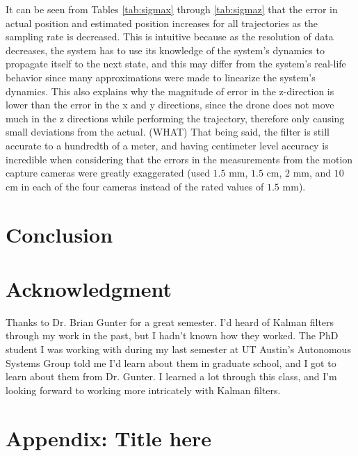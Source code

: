 \documentclass[letterpaper, preprint, paper,11pt]{AAS}	%
\begin{document}
It can be seen from Tables \ref{tab:sigmax} through \ref{tab:sigmaz} that the error in actual position and estimated position increases for all trajectories as the sampling rate is decreased. This is intuitive because as the resolution of data decreases, the system has to use its knowledge of the system's dynamics to propagate itself to the next state, and this may differ from the system's real-life behavior since many approximations were made to linearize the system's dynamics. This also explains why the magnitude of error in the z-direction is lower than the error in the x and y directions, since the drone does not move much in the z directions while performing the trajectory, therefore only causing small deviations from the actual. (WHAT) That being said, the filter is still accurate to a hundredth of a meter, and having centimeter level accuracy is incredible when considering that the errors in the measurements from the motion capture cameras were greatly exaggerated (used $1.5$ mm, $1.5$ cm, $2$ mm, and $10$ cm in each of the four cameras instead of the rated values of $1.5$ mm\cite{vicon_2022}).

\section{Conclusion}


\section{Acknowledgment}

Thanks to Dr. Brian Gunter for a great semester. I'd heard of Kalman filters through my work in the past, but I hadn't known how they worked. The PhD student I was working with during my last semester at UT Austin's Autonomous Systems Group told me I'd learn about them in graduate school, and I got to learn about them from Dr. Gunter. I learned a lot through this class, and I'm looking forward to working more intricately with Kalman filters. 

\appendix
\section*{Appendix: Title here}


\end{document}
